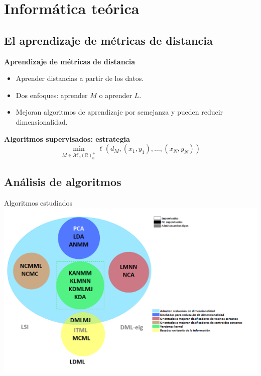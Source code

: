 \documentclass[10pt, compress]{beamer}
\newcommand\R{\mathbb{R}}
\begin{document}
\section{Informática teórica}

\subsection{El aprendizaje de métricas de distancia}

\begin{frame}
  \begin{tcolorbox}[colback=ChetwodeBlue!10,colframe=ChetwodeBlue!60]
    \begin{center}
      {\color{TurkishRose} \small\textbf{Aprendizaje de métricas de distancia}}
      \begin{itemize}
        \item Aprender distancias a partir de los datos.
        \item Dos enfoques: aprender $M$ o aprender $L$.
        \item Mejoran algoritmos de aprendizaje por semejanza y pueden reducir dimensionalidad.
      \end{itemize}
    \end{center}
  \end{tcolorbox}

  \begin{tcolorbox}[colback=ChetwodeBlue!10,colframe=ChetwodeBlue!60]
    \begin{center}
      {\color{TurkishRose} \small\textbf{Algoritmos supervisados: estrategia}}
      \[ \min_{M \in \mathcal{M}_d(\R)^+_0} \ell(d_M, (x_1,y_1), \dots, (x_N, y_N)) \]
    \end{center}
  \end{tcolorbox}
\end{frame}

\subsection{Análisis de algoritmos}

\begin{frame}{Algoritmos estudiados}
  \centering\includegraphics[width=\textwidth]{images/algs.png}
\end{frame}
\end{document}
